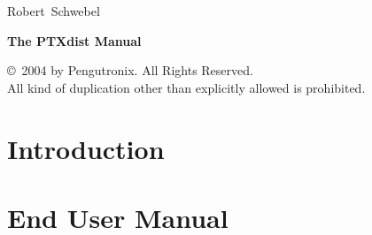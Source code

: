 \documentclass[10pt,a4paper,pointlessnumbers,bibtotocnumbered,headsepline]{scrbook}
\begin{document}

\newpage
\thispagestyle{empty}

\begin{center}
{
\Large \sf Robert~Schwebel 

\vspace{2 cm}

\Huge \sf \textbf{The PTXdist Manual}
}

\vspace{\fill}

{
\Large \sf \copyright \, 2004 by Pengutronix. All Rights Reserved. \\
All kind of duplication other than explicitly allowed is prohibited.
}

\end{center}

\newpage

\thispagestyle{headings}

{
\parskip0mm
\tableofcontents
}


\part{Introduction}



\part{End User Manual}




%
%

%
%
%
%

\end{document}
